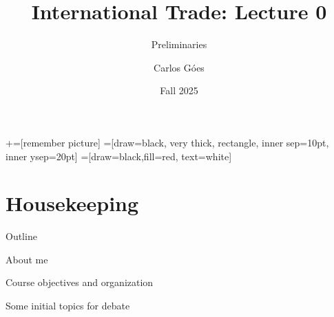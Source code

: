 \documentclass[notes,11pt, aspectratio=169, xcolor=table]{beamer}
\title[]{International Trade: Lecture 0}
\subtitle[]{Preliminaries}
\author[Góes]
{Carlos Góes\inst{1}}
\date{Fall 2025}
\institute[GWU]{\inst{1} George Washington University }
\newenvironment{wideitemize}{\itemize\addtolength{\itemsep}{10pt}}{\enditemize}
\begin{document}
\newcommand\marktopleft[1]{%
    \tikz[overlay,remember picture] 
        \node (marker-#1-a) at (-.3em,.3em) {};%
}
\newcommand\markbottomright[2]{%
    \tikz[overlay,remember picture] 
        \node (marker-#1-b) at (0em,0em) {};%
}
+=[remember picture] 
 =[draw=black, very thick, rectangle, inner sep=10pt, inner ysep=20pt]
 =[draw=black,fill=red, text=white]















\frame{\titlepage}
\addtocounter{framenumber}{-1}




\section{Housekeeping}

\begin{frame}{Outline}
\begin{wideitemize}
\item About me
\item Course objectives and organization
\item Some initial topics for debate
    
\end{wideitemize}

\end{frame}
\end{document}
